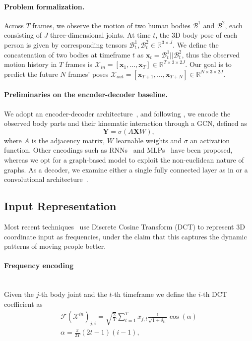 \documentclass[10pt,twocolumn,letterpaper]{article}
\begin{document}
\paragraph{Problem formalization.} \label{par:prob}
Across $T$ frames, we observe the motion of two human bodies $\mathcal{B}^1$ and $\mathcal{B}^2$, each consisting of $J$ three-dimensional joints.
At time $t$, the 3D body pose of each person is given by corresponding tensors $\mathcal{B}_{t}^{1}, \mathcal{B}_{t}^{2} \in \mathbb{R}^{3 \times J}$. 
We define the concatenation of two bodies at timeframe $t$ as $\textbf{x}_t = \mathcal{B}_t^1 || \mathcal{B}_t^2$, thus the observed motion history in $T$ frames is $\mathcal{X}_{in} = \left[ \textbf{x}_1, \dots, \textbf{x}_T \right] \in \mathbb{R}^{T \times 3 \times 2J}$. 
Our goal is to predict the future $N$ frames' poses $\mathcal{X}_{out} = \left[ \textbf{x}_{T+1}, \dots, \textbf{x}_{T+N} \right] \in \mathbb{R}^{N \times 3 \times 2J}$.

\paragraph{Preliminaries on the encoder-decoder baseline.} 
We adopt an encoder-decoder architecture~\cite{sofianos21, sampieri22}, and following \cite{yan18, zhang17}, we encode the observed body parts and their kinematic interaction through a GCN, defined as 
\begin{equation}
    \label{eq:plaingcn}
    {\mathbf{Y}} = \sigma({A}\mathbf{X}{W}),
\end{equation}
where $A$ is the adjacency matrix, $W$ learnable weights and $\sigma$ an activation function.
Other encodings such as RNNs~\cite{yong15, chiu19} and MLPs~\cite{guo2022back} have been proposed, whereas we opt for a graph-based model to exploit the non-euclidean nature of graphs.
As a decoder, we examine either a single fully connected layer as in \cite{guo2022back} or a convolutional architecture~\cite{sofianos21, Ma22}.

\subsection{Input Representation}\label{ssec:inp_rep}

Most recent techniques~\cite{guo2022back, mao19ltd, mao20his, Akhter08} use Discrete Cosine Transform (DCT) to represent 3D coordinate input as frequencies, under the claim that this captures the dynamic patterns of moving people better.

\paragraph{Frequency encoding} \label{para:dct} \greencheck \\
Given the $j$-th body joint and the $t$-th timeframe we define the $i$-th DCT coefficient as 
\begin{gather}
    \mathcal{F}(\mathcal{X}^{in})_{j,i} = \sqrt{\frac{2}{T}} \sum_{t=1}^T x_{j,t}  \frac{1}{\sqrt{1+\delta_{i1}}} \cos \left(\alpha\right) \\
    \alpha = \frac{\pi}{2T}(2t-1)(i-1),
\end{gather}
\end{document}
